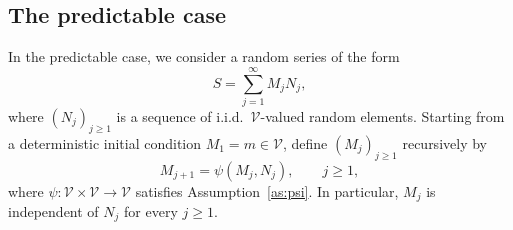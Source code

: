 \documentclass[preprint,12pt]{elsarticle}
\theoremstyle{definition}
\theoremstyle{remark}
\newcommand{\Mbf}{{ M}}
\newcommand{\Nbf}{{ N}}
\newcommand{\Sbf}{{ S}}
\newcommand{\mbf}{{ m}}
\newcommand{\1}{{\mathbf 1}}
\numberwithin{equation}{section}
\newcommand{\Vcal}{\mathcal{V}}
\begin{document}
  \subsection{The predictable case}\label{subsec:2:pred}

  In the predictable case, we consider a random series of the form
  \begin{equation*}
    \Sbf=\sum_{j=1}^\infty\Mbf_j\Nbf_j,
  \end{equation*}
  where $(\Nbf_j)_{j\geq1}$ is a sequence of i.i.d.\ $\Vcal$-valued random
  elements. Starting from a deterministic initial condition
  $\Mbf_1=\mbf\in\Vcal$, define $(\Mbf_j)_{j\geq1}$ recursively by
  \begin{equation*}
    \Mbf_{j+1}=\psi(\Mbf_j,\Nbf_j),
    \qquad j\geq1,
  \end{equation*}
  where $\psi\colon\Vcal\times\Vcal\to\Vcal$ satisfies
  Assumption~\ref{as:psi}. In particular, $\Mbf_j$ is independent of
  $\Nbf_j$ for every $j\geq1$.
\end{document}

